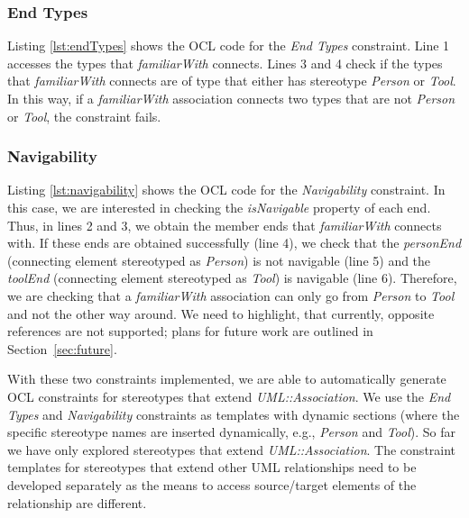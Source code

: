 \subsubsection{End Types}
Listing \ref{lst:endTypes} shows the OCL code for the \emph{End Types} constraint. Line 1 accesses the types that \emph{familiarWith} connects. Lines 3 and 4 check if the types that \emph{familiarWith} connects are of type that either has stereotype \emph{Person} or \emph{Tool}. In this way, if a \emph{familiarWith} association connects two types that are not \emph{Person} or \emph{Tool}, the constraint fails.




\subsubsection{Navigability}
Listing \ref{lst:navigability} shows the OCL code for the \emph{Navigability} constraint. In this case, we are interested in checking the \emph{isNavigable} property of each end. Thus, in lines 2 and 3, we obtain the member ends that \emph{familiarWith} connects with. If these ends are obtained successfully (line 4), we check that the \emph{personEnd} (connecting element stereotyped as \emph{Person}) is not navigable (line 5) and the \emph{toolEnd} (connecting element stereotyped as \emph{Tool}) is navigable (line 6). Therefore, we are checking that a \emph{familiarWith} association can only go from \emph{Person} to \emph{Tool} and not the other way around. We need to highlight, that currently, opposite references are not supported; plans for future work are outlined in Section~\ref{sec:future}.

\begin{figure}[h]
	
	
	\vspace*{-5mm}
\end{figure}

With these two constraints implemented, we are able to automatically generate 
OCL constraints for stereotypes that extend \emph{UML::Association}. We use the 
\emph{End Types} and \emph{Navigability} constraints as templates with dynamic 
sections (where the specific stereotype names are inserted dynamically, e.g., 
\emph{Person} and \emph{Tool}). So far we have only explored stereotypes that 
extend \emph{UML::Association}. The constraint templates for stereotypes that 
extend other UML relationships need to be developed separately as the means to 
access source/target elements of the relationship are different.


